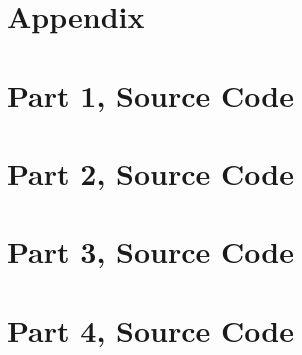 
\section{Appendix}\label{sec:appendix}
\begin{appendix}

    \section{Part 1, Source Code}\label{sec:part1_source}
        \bigbreak
        {
            \selectfont\footnotesize
            
        }

    \newpage
    \section{Part 2, Source Code}\label{sec:part2_source}
        \bigbreak
        {
            \selectfont\footnotesize
            
        }

    \newpage
    \section{Part 3, Source Code}\label{sec:part3_source}
        \bigbreak
        {
            \selectfont\footnotesize
            
        }

    \newpage
    \section{Part 4, Source Code}\label{sec:part4_source}
        \bigbreak
        {
            \selectfont\footnotesize
            
        }

\end{appendix}